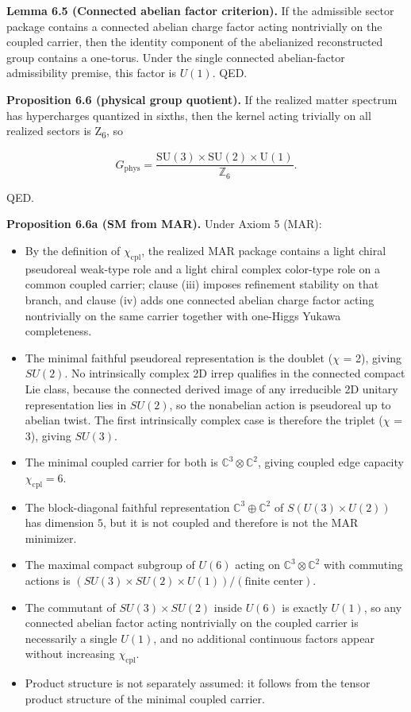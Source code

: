 \textbf{Lemma 6.5 (Connected abelian factor criterion).} If the admissible sector package contains a connected abelian charge factor acting nontrivially on the coupled carrier, then the identity component of the abelianized reconstructed group contains a one-torus. Under the single connected abelian-factor admissibility premise, this factor is \(U(1)\). QED.

\textbf{Proposition 6.6 (physical group quotient).} If the realized matter spectrum has hypercharges quantized in sixths, then the kernel acting trivially on all realized sectors is Z\textsubscript{6}, so

\[
G_{\mathrm{phys}} = \frac{\mathrm{SU}(3)\times \mathrm{SU}(2)\times \mathrm{U}(1)}{\mathbb Z_6}.
\]

QED.

\textbf{Proposition 6.6a (SM from MAR).} Under Axiom 5 (MAR):

\begin{itemize}
\tightlist
\item
  By the definition of \(\chi_{\mathrm{cpl}}\), the realized MAR package contains a light chiral pseudoreal weak-type role and a light chiral complex color-type role on a common coupled carrier; clause (iii) imposes refinement stability on that branch, and clause (iv) adds one connected abelian charge factor acting nontrivially on the same carrier together with one-Higgs Yukawa completeness.
\item
  The minimal faithful pseudoreal representation is the doublet (\ensuremath{\chi} = 2), giving \(SU(2)\). No intrinsically complex 2D irrep qualifies in the connected compact Lie class, because the connected derived image of any irreducible 2D unitary representation lies in \(SU(2)\), so the nonabelian action is pseudoreal up to abelian twist. The first intrinsically complex case is therefore the triplet (\ensuremath{\chi} = 3), giving \(SU(3)\).
\item
  The minimal coupled carrier for both is \(\mathbb{C}^3 \otimes \mathbb{C}^2\), giving coupled edge capacity \(\chi_{\mathrm{cpl}} = 6\).
\item
  The block-diagonal faithful representation \(\mathbb{C}^3 \oplus \mathbb{C}^2\) of \(S(U(3)\times U(2))\) has dimension \(5\), but it is not coupled and therefore is not the MAR minimizer.
\item
  The maximal compact subgroup of \(U(6)\) acting on \(\mathbb{C}^3 \otimes \mathbb{C}^2\) with commuting actions is \((SU(3) \times SU(2) \times U(1))/(\text{finite center})\).
\item
  The commutant of \(SU(3) \times SU(2)\) inside \(U(6)\) is exactly \(U(1)\), so any connected abelian factor acting nontrivially on the coupled carrier is necessarily a single \(U(1)\), and no additional continuous factors appear without increasing \(\chi_{\mathrm{cpl}}\).
\item
  Product structure is not separately assumed: it follows from the tensor product structure of the minimal coupled carrier.
\end{itemize}

